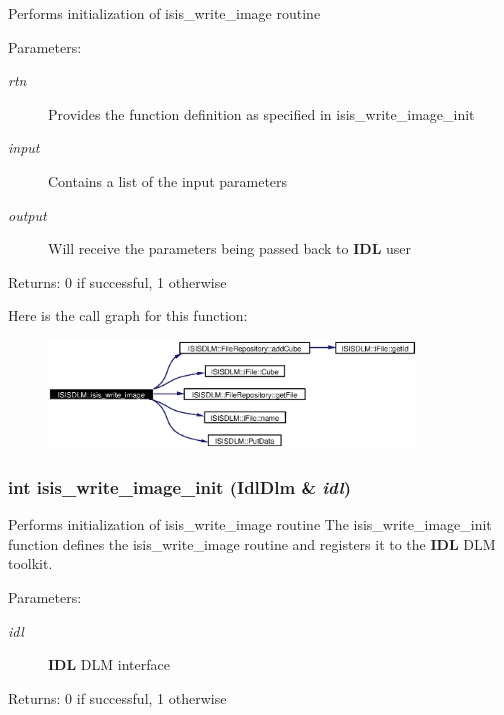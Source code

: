 Performs initialization of isis\_\-write\_\-image routine \begin{Desc}
\item[Parameters:]
\begin{description}
\item[{\em rtn}]Provides the function definition as specified in isis\_\-write\_\-image\_\-init \item[{\em input}]Contains a list of the input parameters \item[{\em output}]Will receive the parameters being passed back to {\bf IDL} user \end{description}
\end{Desc}
\begin{Desc}
\item[Returns:]0 if successful, 1 otherwise \end{Desc}


Here is the call graph for this function:\begin{figure}[H]
\begin{center}
\leavevmode
\includegraphics[width=277pt]{namespaceISISDLM_a39_cgraph}
\end{center}
\end{figure}
\subsubsection{\setlength{\rightskip}{0pt plus 5cm}int isis\_\-write\_\-image\_\-init (Idl\-Dlm \& {\em idl})}\label{namespaceISISDLM_a38}


Performs initialization of isis\_\-write\_\-image routine The isis\_\-write\_\-image\_\-init function defines the isis\_\-write\_\-image routine and registers it to the {\bf IDL} DLM toolkit. \begin{Desc}
\item[Parameters:]
\begin{description}
\item[{\em idl}]{\bf IDL} DLM interface \end{description}
\end{Desc}
\begin{Desc}
\item[Returns:]0 if successful, 1 otherwise \end{Desc}


